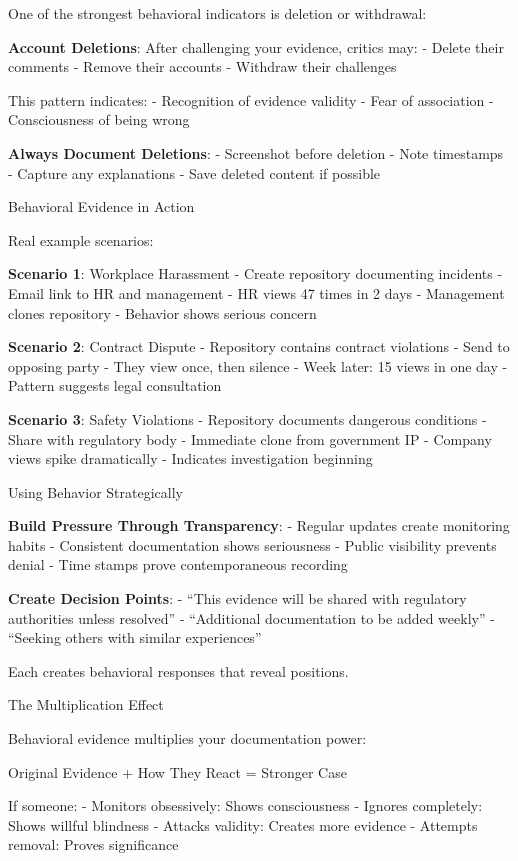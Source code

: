 One of the strongest behavioral indicators is deletion or withdrawal:

\textbf{Account Deletions}: After challenging your evidence, critics
may: - Delete their comments - Remove their accounts - Withdraw their
challenges

This pattern indicates: - Recognition of evidence validity - Fear of
association - Consciousness of being wrong

\textbf{Always Document Deletions}: - Screenshot before deletion - Note
timestamps - Capture any explanations - Save deleted content if possible

Behavioral Evidence in Action

Real example scenarios:

\textbf{Scenario 1}: Workplace Harassment - Create repository
documenting incidents - Email link to HR and management - HR views 47
times in 2 days - Management clones repository - Behavior shows serious
concern

\textbf{Scenario 2}: Contract Dispute - Repository contains contract
violations - Send to opposing party - They view once, then silence -
Week later: 15 views in one day - Pattern suggests legal consultation

\textbf{Scenario 3}: Safety Violations - Repository documents dangerous
conditions - Share with regulatory body - Immediate clone from
government IP - Company views spike dramatically - Indicates
investigation beginning

Using Behavior Strategically

\textbf{Build Pressure Through Transparency}: - Regular updates create
monitoring habits - Consistent documentation shows seriousness - Public
visibility prevents denial - Time stamps prove contemporaneous recording

\textbf{Create Decision Points}: - ``This evidence will be shared with
regulatory authorities unless resolved'' - ``Additional documentation to
be added weekly'' - ``Seeking others with similar experiences''

Each creates behavioral responses that reveal positions.

The Multiplication Effect

Behavioral evidence multiplies your documentation power:

Original Evidence + How They React = Stronger Case

If someone: - Monitors obsessively: Shows consciousness - Ignores
completely: Shows willful blindness - Attacks validity: Creates more
evidence - Attempts removal: Proves significance

